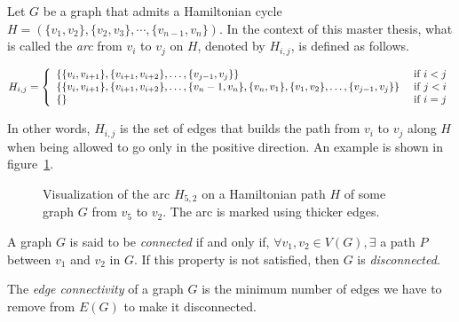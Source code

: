 \begin{definition}
    \label{def:arc}
    Let $G$ be a graph that admits a Hamiltonian cycle $H = \left(\{v_1, v_2\}, \{v_2, v_3\}, \cdots, \{v_{n-1}, v_n\}\right)$.
    In the context of this master thesis, what is called the \textit{arc} from $v_i$ to $v_j$ on $H$, denoted by $H_{i, j}$, is defined as follows.
    
    \begin{center}
        $H_{i, j} = \left\{\begin{array}{l l}
            \left\{\{v_i, v_{i+1}\}, \{v_{i+1}, v_{i+2}\}, \dots, \{v_{j-1}, v_j\}\right\}                                                       & \mbox{ if } i < j \\
            \left\{\{v_i, v_{i+1}\}, \{v_{i+1}, v_{i+2}\}, \dots, \{v_n - 1, v_n\},  \{v_n, v_1\}, \{v_1, v_2\}, \dots, \{v_{j-1}, v_j\}\right\} & \mbox{ if } j < i \\
            \left\{\right\}                                                                                                                      & \mbox{ if } i = j
        \end{array}\right.$
    \end{center}
    
    In other words, $H_{i, j}$ is the set of edges that builds the path from $v_i$ to $v_j$ along $H$ when being allowed to go only in the positive direction.
    An example is shown in figure~\ref{fig:H_i_j}.

    \begin{figure}[H]
        \caption{Visualization of the arc $H_{5, 2}$ on a Hamiltonian path $H$ of some graph $G$ from $v_5$ to $v_2$. The arc is marked using thicker edges.}
        \label{fig:H_i_j}
    \end{figure}
    
\end{definition}

\begin{definition}
    \label{def:connected_graph}
    A graph $G$ is said to be \textit{connected} if and only if, $\forall v_1, v_2 \in V(G), \exists$ a path $P$ between $v_1$ and $v_2$ in $G$.
    If this property is not satisfied, then $G$ is \textit{disconnected}.
\end{definition}

\begin{definition}
    \label{def:edge_connectivity}
    The \textit{edge connectivity} of a graph $G$ is the minimum number of edges we have to remove from $E(G)$ to make it disconnected.
\end{definition}

